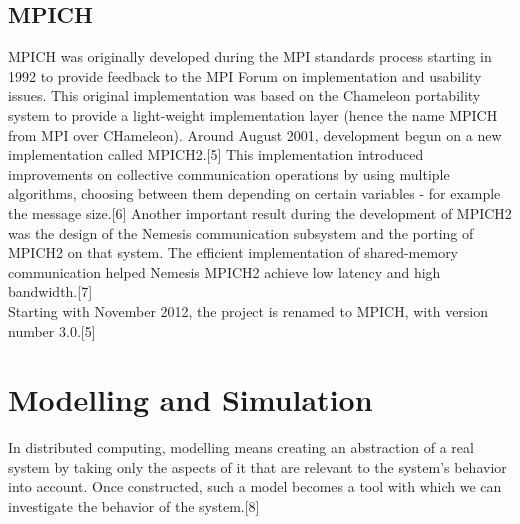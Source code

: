 \subsection{MPICH}
MPICH was originally developed during the MPI standards process
starting in 1992 to provide feedback to the MPI Forum on
implementation and usability issues. This original implementation was
based on the Chameleon portability system to provide a light-weight
implementation layer (hence the name MPICH from MPI over
CHameleon). Around August 2001, development begun on a new
implementation called MPICH2.[5] This implementation introduced
improvements on collective communication operations by using multiple
algorithms, choosing between them depending on certain variables - for
example the message size.[6] Another important result during the
development of MPICH2 was the design of the Nemesis communication
subsystem and the porting of MPICH2 on that system. The efficient
implementation of shared-memory communication helped Nemesis MPICH2
achieve low latency and high bandwidth.[7]\\
Starting with November 2012, the project is renamed to MPICH, with
version number 3.0.[5]
\section{Modelling and Simulation}
In distributed computing, modelling means creating an abstraction of a
real system by taking only the aspects of it that are relevant to the
system's behavior into account. Once constructed, such a model becomes
a tool with which we can investigate the behavior of the system.[8]

